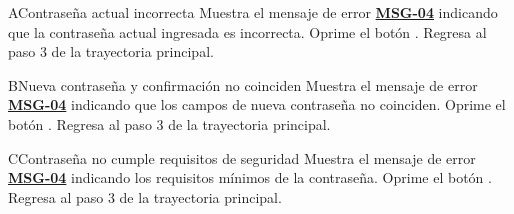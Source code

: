 \begin{UCtrayectoriaA}{A}{Contraseña actual incorrecta}
	\UCpaso Muestra el mensaje de error \hyperlink{mMSG04}{\bf MSG-04} indicando que la contraseña actual ingresada es incorrecta.
	\UCpaso[\UCactor] Oprime el botón .
	\UCpaso Regresa al paso 3 de la trayectoria principal.
\end{UCtrayectoriaA}

\begin{UCtrayectoriaA}{B}{Nueva contraseña y confirmación no coinciden}
	\UCpaso Muestra el mensaje de error \hyperlink{mMSG04}{\bf MSG-04} indicando que los campos de nueva contraseña no coinciden.
	\UCpaso[\UCactor] Oprime el botón .
	\UCpaso Regresa al paso 3 de la trayectoria principal.
\end{UCtrayectoriaA}

\begin{UCtrayectoriaA}{C}{Contraseña no cumple requisitos de seguridad}
	\UCpaso Muestra el mensaje de error \hyperlink{mMSG04}{\bf MSG-04} indicando los requisitos mínimos de la contraseña.
	\UCpaso[\UCactor] Oprime el botón .
	\UCpaso Regresa al paso 3 de la trayectoria principal.
\end{UCtrayectoriaA}

